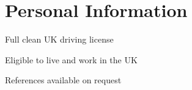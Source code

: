 \documentclass[a4paper]{deedy-resume} %
\begin{document}

\newpage %


\begin{minipage}[t]{0.33\textwidth} %

\section{Personal Information}
\vspace{\topsep} 
\begin{tightitemize}
\item Full clean UK driving license 
\item Eligible to live and work in the UK 
\item References available on request
\end{tightitemize}

\end{minipage} %
\hfill
\end{document}
